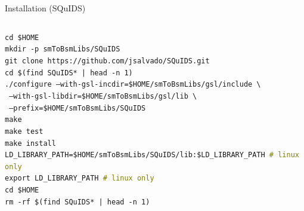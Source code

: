 \documentclass[]{beamer}
\newcommand{\backupend}{
	\setcounter{framenumber}{\value{finalframe}}
}
\begin{document}
\begin{frame}{Installation (SQuIDS)}
  \begin{columns}
    \begin{column}{\textwidth}
      {\tiny
        \begin{tcolorbox}[colback=gray!5!white]
        \texttt{cd \$HOME} \\
        \texttt{mkdir -p smToBsmLibs/SQuIDS} \\
        \texttt{git clone https://github.com/jsalvado/SQuIDS.git} \\
        \texttt{cd \$(find SQuIDS* | head -n 1)} \\
        \texttt{./configure --with-gsl-incdir=\$HOME/smToBsmLibs/gsl/include \textbackslash} \\
        \texttt{  --with-gsl-libdir=\$HOME/smToBsmLibs/gsl/lib \textbackslash} \\ 
        \texttt{  --prefix=\$HOME/smToBsmLibs/SQuIDS} \\
        \texttt{make} \\
        \texttt{make test} \\
        \texttt{make install} \\
        \texttt{LD\_LIBRARY\_PATH=\$HOME/smToBsmLibs/SQuIDS/lib:\$LD\_LIBRARY\_PATH \textcolor{olive}{\# linux only}} \\
        \texttt{export LD\_LIBRARY\_PATH \textcolor{olive}{\# linux only}} \\
        \texttt{cd \$HOME} \\
        \texttt{rm -rf \$(find SQuIDS* | head -n 1)}
      \end{tcolorbox}}
    \end{column}
  \end{columns}
\end{frame}

\backupend
\end{document}
